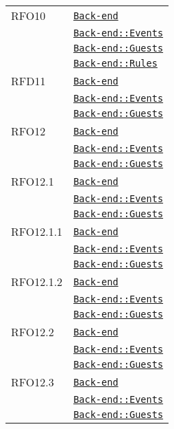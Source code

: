 \begin{longtable}{|>{\centering}m{3cm}|m{10cm}<{\centering}|}
RFO10 & \hyperref[Back-end]{\texttt{Back-end}}\\
& \hyperref[Back-end::Events]{\texttt{Back-end::Events}}\\
& \hyperref[Back-end::Guests]{\texttt{Back-end::Guests}}\\
& \hyperref[Back-end::Rules]{\texttt{Back-end::Rules}}\\ \hline

RFD11 & \hyperref[Back-end]{\texttt{Back-end}}\\
& \hyperref[Back-end::Events]{\texttt{Back-end::Events}}\\
& \hyperref[Back-end::Guests]{\texttt{Back-end::Guests}}\\ \hline

RFO12 & \hyperref[Back-end]{\texttt{Back-end}}\\
& \hyperref[Back-end::Events]{\texttt{Back-end::Events}}\\
& \hyperref[Back-end::Guests]{\texttt{Back-end::Guests}}\\ \hline

RFO12.1 & \hyperref[Back-end]{\texttt{Back-end}}\\
& \hyperref[Back-end::Events]{\texttt{Back-end::Events}}\\
& \hyperref[Back-end::Guests]{\texttt{Back-end::Guests}}\\ \hline

RFO12.1.1 & \hyperref[Back-end]{\texttt{Back-end}}\\
& \hyperref[Back-end::Events]{\texttt{Back-end::Events}}\\
& \hyperref[Back-end::Guests]{\texttt{Back-end::Guests}}\\ \hline

RFO12.1.2 & \hyperref[Back-end]{\texttt{Back-end}}\\
& \hyperref[Back-end::Events]{\texttt{Back-end::Events}}\\
& \hyperref[Back-end::Guests]{\texttt{Back-end::Guests}}\\ \hline

RFO12.2 & \hyperref[Back-end]{\texttt{Back-end}}\\
& \hyperref[Back-end::Events]{\texttt{Back-end::Events}}\\
& \hyperref[Back-end::Guests]{\texttt{Back-end::Guests}}\\ \hline

RFO12.3 & \hyperref[Back-end]{\texttt{Back-end}}\\
& \hyperref[Back-end::Events]{\texttt{Back-end::Events}}\\
& \hyperref[Back-end::Guests]{\texttt{Back-end::Guests}}\\ \hline


\end{longtable}
